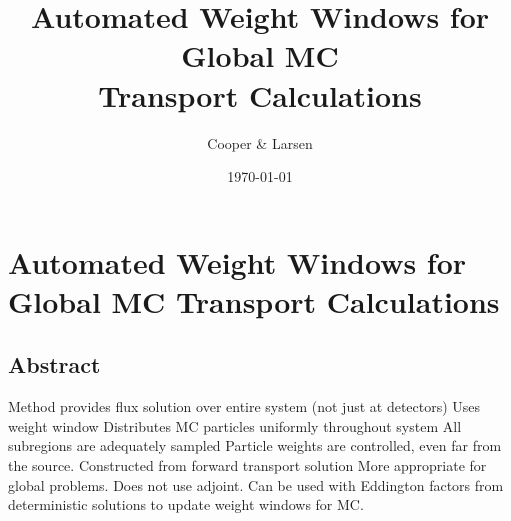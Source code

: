 \documentclass{report}
\begin{document}
\title{Automated Weight Windows for Global MC \\
         Transport Calculations}
\author{Cooper & Larsen}
\date{\today}
\setcounter{secnumdepth}{0}
\section{Automated Weight Windows for Global MC Transport Calculations}
\subsection{Abstract}
\begin{outline}
 \1 Method provides flux solution over entire system (not just at detectors)
 \1 Uses weight window
    \2 Distributes MC particles uniformly throughout system
      \3 All subregions are adequately sampled
      \3 Particle weights are controlled, even far from the source. 
    \2 Constructed from forward transport solution
      \3 More appropriate for global problems. 
      \3 Does not use adjoint. 
    \2 Can be used with Eddington factors from deterministic solutions to update weight windows for MC. 
\end{outline}
\end{document}
